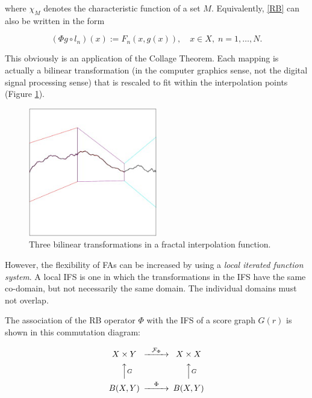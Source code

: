 \documentclass[english,11pt,letterpaper,onecolumn]{scrartcl}
\numberwithin{equation}{section}
\newcommand{\cF}{\mathcal{F}}
\newcommand{\be}{\begin{equation}}
\newcommand{\ee}{\end{equation}}
\begin{document}
\noindent where $\chi_M$ denotes the characteristic function of a set $M$.
Equivalently, \eqref{RB} can also be written in the form

\be\label{3.3}
(\Phi g \circ l_n) (x) := F_n (x, g(x)),\quad x\in X, \;n = 1, \ldots, N.
\ee


This obviously is an application of the Collage Theorem. Each mapping is
actually a bilinear transformation (in the computer graphics sense, not the
digital signal processing sense) that is rescaled to fit within the
interpolation points (Figure \ref{fig:fif}).

\begin{figure}
\centerline{\includegraphics[width = 0.5\textwidth]{interp}}
\caption{\label{fig:fif} Three bilinear transformations in
a fractal interpolation function.\protect\footnotemark}
\end{figure}


However, the flexibility of FAs can be increased by using a
\textit{local iterated function system}. A local IFS is one in which the
transformations in the IFS have the same co-domain, but not necessarily the
same domain. The individual domains must not overlap.

The association of the RB operator $\Phi$ with the IFS of a score graph $G(r)$ is
shown in this commutation diagram:

\be
\begin{CD}
X\times Y @>\cF_\Phi>> X\times X\\
@AAGA                  @AAGA\\
B(X,Y) @>\Phi>>  B(X,Y)
\end{CD}
\ee
\end{document}
